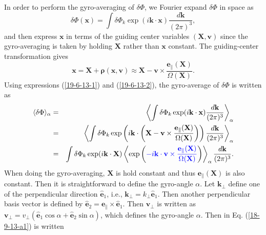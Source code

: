 \documentclass{article}
\newcommand{\tmcolor}[2]{{\color{#1}{#2}}}
\newcommand{\tmmathbf}[1]{\ensuremath{\boldsymbol{#1}}}
\begin{document}
In order to perform the gyro-averaging of $\delta \Phi$, we Fourier expand
$\delta \Phi$ in space as
\begin{equation}
  \label{19-6-13-1} \delta \Phi (\mathbf{x}) = \int \delta \Phi_k \exp
  (i\mathbf{k} \cdot \mathbf{x}) \frac{d\mathbf{k}}{(2 \pi)^3},
\end{equation}
and then express $\mathbf{x}$ in terms of the guiding center variables
$(\mathbf{X}, \mathbf{v})$ since the gyro-averaging is taken by holding
$\mathbf{X}$ rather than $\mathbf{x}$ constant. The guiding-center
transformation gives
\begin{equation}
  \label{19-6-13-2} \mathbf{x}=\mathbf{X}+\tmmathbf{\rho} (\mathbf{x},
  \mathbf{v}) \approx \mathbf{X}-\mathbf{v} \times
  \frac{\mathbf{e}_{\parallel} (\mathbf{X})}{\Omega (\mathbf{X})} .
\end{equation}
Using expressions (\ref{19-6-13-1}) and (\ref{19-6-13-2}), the gyro-average of
$\delta \Phi$ is written as
\begin{eqnarray}
  \langle \delta \Phi \rangle_{\alpha} & = & \left\langle \int \delta \Phi_k
  \exp (i\mathbf{k} \cdot \mathbf{x}) \frac{d\mathbf{k}}{(2 \pi)^3}
  \right\rangle_{\alpha} \nonumber\\
  & = & \left\langle \int \delta \Phi_k \exp \left( i\mathbf{k} \cdot \left(
  \mathbf{X}-\mathbf{v} \times \frac{\mathbf{e}_{\parallel}
  (\mathbf{X})}{\Omega (\mathbf{X})} \right) \right) \frac{d\mathbf{k}}{(2
  \pi)^3} \right\rangle_{\alpha} \nonumber\\
  & = & \int \delta \Phi_k \exp (i\mathbf{k} \cdot \mathbf{X}) \left\langle
  \exp \left( \tmcolor{blue}{- i\mathbf{k} \cdot \mathbf{v} \times
  \frac{\mathbf{e}_{\parallel} (\mathbf{X})}{\Omega (\mathbf{X})}} \right)
  \right\rangle_{\alpha} \frac{d\mathbf{k}}{(2 \pi)^3} .  \label{18-9-13-a1}
\end{eqnarray}
When doing the gyro-averaging, $\mathbf{X}$ is hold constant and thus
$\mathbf{e}_{\parallel} (\mathbf{X})$ is also constant. Then it is
straightforward to define the gyro-angle $\alpha$. Let $\mathbf{k}_{\perp}$
define one of the perpendicular direction $\hat{\mathbf{e}}_1$, i.e.,
$\mathbf{k}_{\perp} = k_{\perp} \hat{\mathbf{e}}_1$. Then another
perpendicular basis vector is defined by $\hat{\mathbf{e}}_2
=\mathbf{e}_{\parallel} \times \hat{\mathbf{e}}_1$. Then $\mathbf{v}_{\perp}$
is written as $\mathbf{v}_{\perp} = v_{\perp} (\hat{\mathbf{e}}_1 \cos \alpha
+ \hat{\mathbf{e}}_2 \sin \alpha)$, which defines the gyro-angle $\alpha$.
Then \tmcolor{blue}{the blue expression} in Eq. (\ref{18-9-13-a1}) is written
\end{document}
